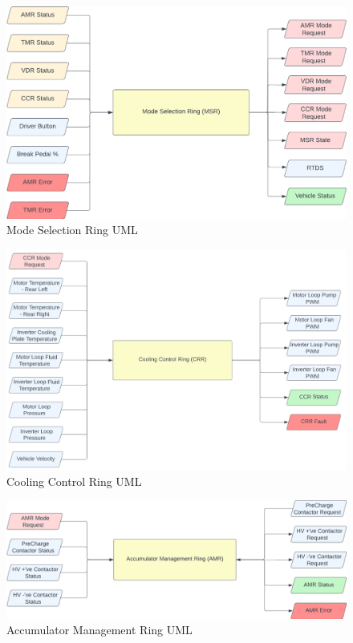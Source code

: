 \documentclass[12pt]{article}
\begin{document}
\begin{figure}[htp]
    \centering
    \includegraphics[width=15cm]{msr_uml.png}
    \caption{Mode Selection Ring UML}
    \label{fig:msr_uml}
\end{figure}

\begin{figure}[htp]
    \centering
    \includegraphics[width=15cm]{crr_uml.png}
    \caption{Cooling Control Ring UML}
    \label{fig:ccr_uml}
\end{figure}

\begin{figure}[htp]
    \centering
    \includegraphics[width=15cm]{amr_uml.png}
    \caption{Accumulator Management Ring UML}
    \label{fig:amr_uml}
\end{figure}
\end{document}
